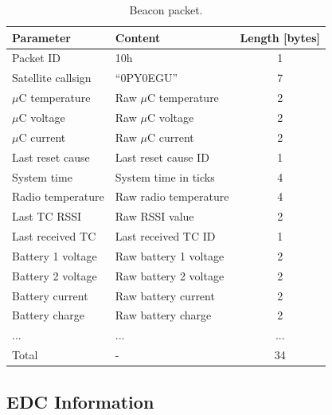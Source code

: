\begin{table}[!h]
    \centering
    \begin{tabular}{llc}
        \toprule[1.5pt]
        \textbf{Parameter} & \textbf{Content}       & \textbf{Length [bytes]} \\
        \midrule
        Packet ID          & 10h                    & 1 \\
        Satellite callsign & ``0PY0EGU''            & 7 \\
        $\mu$C temperature & Raw $\mu$C temperature & 2 \\
        $\mu$C voltage     & Raw $\mu$C voltage     & 2 \\
        $\mu$C current     & Raw $\mu$C current     & 2 \\
        Last reset cause   & Last reset cause ID    & 1 \\
        System time        & System time in ticks   & 4 \\
        Radio temperature  & Raw radio temperature  & 4 \\
        Last TC RSSI       & Raw RSSI value         & 2 \\
        Last received TC   & Last received TC ID    & 1 \\
        Battery 1 voltage  & Raw battery 1 voltage  & 2 \\
        Battery 2 voltage  & Raw battery 2 voltage  & 2 \\
        Battery current    & Raw battery current    & 2 \\
        Battery charge     & Raw battery charge     & 2 \\
        ...                & ...                    & ... \\
        \midrule
        Total              & -                      & 34 \\
        \bottomrule[1.5pt]
    \end{tabular}
    \caption{Beacon packet.}
    \label{tab:telemetry-beacon}
\end{table}

\subsection{EDC Information}

